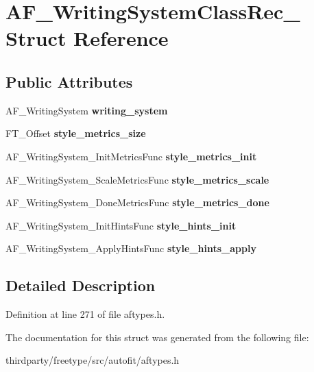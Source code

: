 \hypertarget{struct_a_f___writing_system_class_rec__}{}\section{A\+F\+\_\+\+Writing\+System\+Class\+Rec\+\_\+ Struct Reference}
\label{struct_a_f___writing_system_class_rec__}
\subsection*{Public Attributes}
\begin{DoxyCompactItemize}
\item 
\mbox{\label{struct_a_f___writing_system_class_rec___a15e39fbe7d4b052906a122361324bdd9}} 
A\+F\+\_\+\+Writing\+System {\bfseries writing\+\_\+system}
\item 
\mbox{\label{struct_a_f___writing_system_class_rec___abcb150bc4dada8564e58402c5a9dd6ba}} 
F\+T\+\_\+\+Offset {\bfseries style\+\_\+metrics\+\_\+size}
\item 
\mbox{\label{struct_a_f___writing_system_class_rec___adfd9745593bf661044c311900d08463a}} 
A\+F\+\_\+\+Writing\+System\+\_\+\+Init\+Metrics\+Func {\bfseries style\+\_\+metrics\+\_\+init}
\item 
\mbox{\label{struct_a_f___writing_system_class_rec___aadb9a27e135b28a146fcb74ca09ec8e2}} 
A\+F\+\_\+\+Writing\+System\+\_\+\+Scale\+Metrics\+Func {\bfseries style\+\_\+metrics\+\_\+scale}
\item 
\mbox{\label{struct_a_f___writing_system_class_rec___a272cf847217c9c045f0e4e1b78e87c50}} 
A\+F\+\_\+\+Writing\+System\+\_\+\+Done\+Metrics\+Func {\bfseries style\+\_\+metrics\+\_\+done}
\item 
\mbox{\label{struct_a_f___writing_system_class_rec___a153beda7be46f45b02eea05601952e34}} 
A\+F\+\_\+\+Writing\+System\+\_\+\+Init\+Hints\+Func {\bfseries style\+\_\+hints\+\_\+init}
\item 
\mbox{\label{struct_a_f___writing_system_class_rec___ab8863d4ca14172a8b0df5a47d99ab369}} 
A\+F\+\_\+\+Writing\+System\+\_\+\+Apply\+Hints\+Func {\bfseries style\+\_\+hints\+\_\+apply}
\end{DoxyCompactItemize}


\subsection{Detailed Description}


Definition at line 271 of file aftypes.\+h.



The documentation for this struct was generated from the following file\+:\begin{DoxyCompactItemize}
\item 
thirdparty/freetype/src/autofit/aftypes.\+h\end{DoxyCompactItemize}
